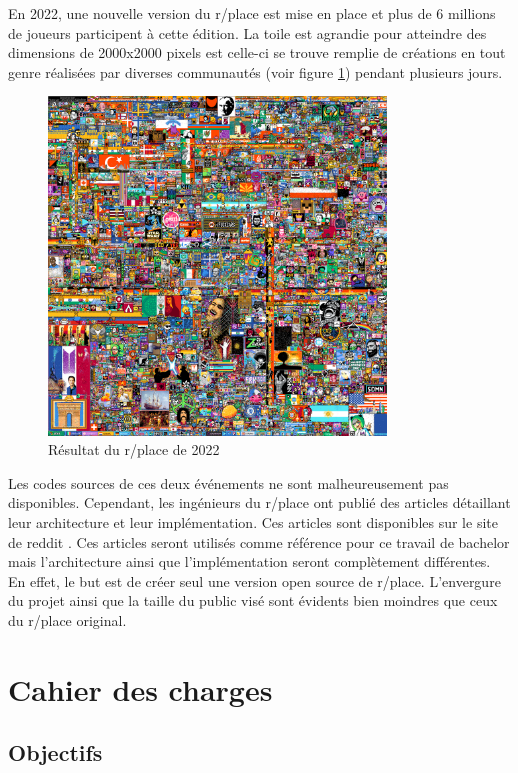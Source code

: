En 2022, une nouvelle version du r/place est mise en place et plus de 6 millions de joueurs participent à cette édition. La toile est agrandie pour atteindre des dimensions de 2000x2000 pixels est celle-ci se trouve remplie de créations en tout genre réalisées par diverses communautés (voir figure \ref{fig:rplace2022}) pendant plusieurs jours.

\begin{figure}[H]
  \centering
  \includegraphics[width=0.8\textwidth]{./assets/figures/rplace.png}
  \caption{Résultat du r/place de 2022}
  \label{fig:rplace2022}
\end{figure}

Les codes sources de ces deux événements ne sont malheureusement pas disponibles. Cependant, les ingénieurs du r/place ont publié des articles détaillant leur architecture et leur implémentation. Ces articles sont disponibles sur le site de \gls{reddit} \cite{rplace2017, rplace2022}. Ces articles seront utilisés comme référence pour ce travail de bachelor mais l'architecture ainsi que l'implémentation seront complètement différentes. En effet, le but est de créer seul une version open source de r/place. L'envergure du projet ainsi que la taille du public visé sont évidents bien moindres que ceux du r/place original.

\section{Cahier des charges}

\subsection{Objectifs}

